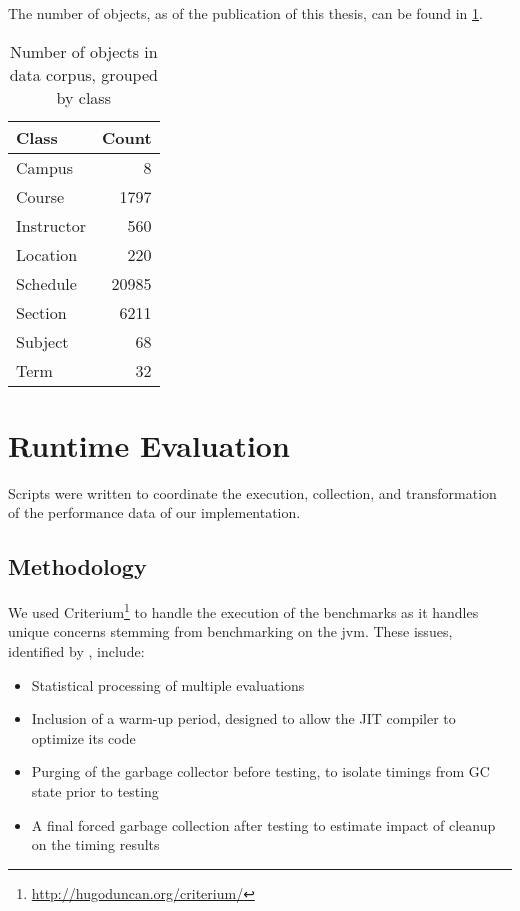 		The number of objects, as of the publication of this thesis, can be found in \cref{tbl:data-corpus-count}.
		
		\begin{table}[H]
			\centering
			\begin{tabular}{lr}
			\toprule
			Class & Count \\
			\midrule
			Campus & 8 \\
			Course & 1797 \\
			Instructor & 560 \\
			Location & 220 \\
			Schedule & 20985 \\
			Section & 6211 \\
			Subject & 68 \\
			Term & 32 \\
			\bottomrule
			\end{tabular}
			
			\caption{Number of objects in data corpus, grouped by class}
			\label{tbl:data-corpus-count}
		\end{table}
	
	\section{Runtime Evaluation}
	\label{sec:runtime-evaluation}
		Scripts were written to coordinate the execution, collection, and transformation of the performance data of our implementation.
		
		\subsection{Methodology}
			We used Criterium\footnote{\url{http://hugoduncan.org/criterium/}} to handle the execution of the benchmarks as it handles unique concerns stemming from benchmarking on the \gls{jvm}.  These issues, identified by \citeauthor{rob-java-bench-08} \cite{rob-java-bench-08}, include:
			
			\begin{itemize}
				\item Statistical processing of multiple evaluations
				\item Inclusion of a warm-up period, designed to allow the JIT compiler to optimize its code
				\item Purging of the garbage collector before testing, to isolate timings from GC state prior to testing
				\item A final forced garbage collection after testing to estimate impact of cleanup on the timing results
			\end{itemize}
		
